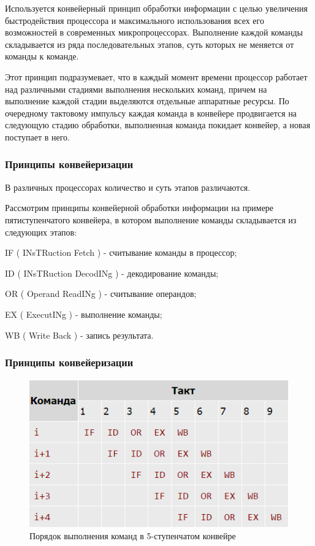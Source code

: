 \documentclass{beamer}
\begin{document}
\begin{frame}

Используется конвейерный принцип обработки информации с целью увеличения быстродействия процессора и максимального использования всех его возможностей в современных микропроцессорах. Выполнение каждой команды складывается из ряда последовательных этапов, суть которых не меняется от команды к команде. 

Этот принцип подразумевает, что в каждый момент времени процессор работает над различными стадиями выполнения нескольких команд, причем на выполнение каждой стадии выделяются отдельные аппаратные ресурсы. По очередному тактовому импульсу каждая команда в конвейере продвигается на следующую стадию обработки, выполненная команда покидает конвейер, а новая поступает в него.

\end{frame}

\begin{frame}
\frametitle{Принципы конвейеризации}

В различных процессорах количество и суть этапов различаются.

Рассмотрим принципы конвейерной обработки информации на примере пятиступенчатого конвейера, в котором выполнение команды складывается из следующих этапов:

IF ( INsTRuction Fetch ) - считывание команды в процессор;

ID ( INsTRuction DecodINg ) - декодирование команды;

OR ( Operand ReadINg ) - считывание операндов;

EX ( ExecutINg ) - выполнение команды;

WB ( Write Back ) - запись результата.

\end{frame}


\begin{frame}
\frametitle{Принципы конвейеризации}

\begin{figure}
\includegraphics[scale=0.9]{Pic_1}
\caption{Порядок выполнения команд в 5-ступенчатом конвейре}
\end{figure}

\end{frame}
\end{document}
